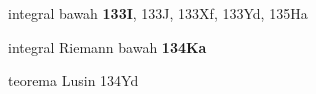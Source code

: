 















































































integral bawah {\bf 133I}, 133J, 133Xf, 133Yd, 135Ha





integral Riemann bawah {\bf 134Ka}












teorema Lusin 134Yd






